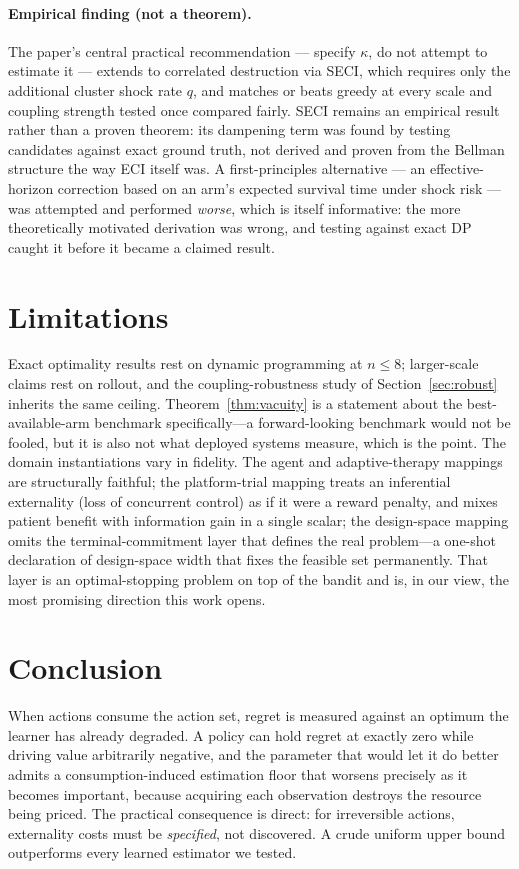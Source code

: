 \paragraph{Empirical finding (not a theorem).}
The paper's central practical recommendation --- specify $\kappa$, do not attempt
to estimate it --- extends to correlated destruction via SECI, which requires
only the additional cluster shock rate $q$, and matches or beats greedy at every
scale and coupling strength tested once compared fairly. SECI remains an
empirical result rather than a proven theorem: its dampening term was found by
testing candidates against exact ground truth, not derived and proven from the
Bellman structure the way ECI itself was. A first-principles alternative --- an
effective-horizon correction based on an arm's expected survival time under
shock risk --- was attempted and performed \emph{worse}, which is itself
informative: the more theoretically motivated derivation was wrong, and testing
against exact DP caught it before it became a claimed result.

\section{Limitations}

Exact optimality results rest on dynamic programming at $n \le 8$;
larger-scale claims rest on rollout, and the coupling-robustness study of
Section~\ref{sec:robust} inherits the same ceiling. Theorem~\ref{thm:vacuity} is a statement about
the best-available-arm benchmark specifically---a forward-looking benchmark would
not be fooled, but it is also not what deployed systems measure, which is the point.
The domain instantiations vary in fidelity. The agent and adaptive-therapy mappings
are structurally faithful; the platform-trial mapping treats an inferential
externality (loss of concurrent control) as if it were a reward penalty, and mixes
patient benefit with information gain in a single scalar; the design-space mapping
omits the terminal-commitment layer that defines the real problem---a one-shot
declaration of design-space width that fixes the feasible set permanently. That
layer is an optimal-stopping problem on top of the bandit and is, in our view, the
most promising direction this work opens.

\section{Conclusion}

When actions consume the action set, regret is measured against an optimum the
learner has already degraded. A policy can hold regret at exactly zero while
driving value arbitrarily negative, and the parameter that would let it do better admits a
consumption-induced estimation floor that worsens precisely as it becomes important, because
acquiring each observation destroys the resource being priced. The practical consequence is
direct: for irreversible actions, externality costs must be \emph{specified}, not
discovered. A crude uniform upper bound outperforms every learned estimator we
tested.

